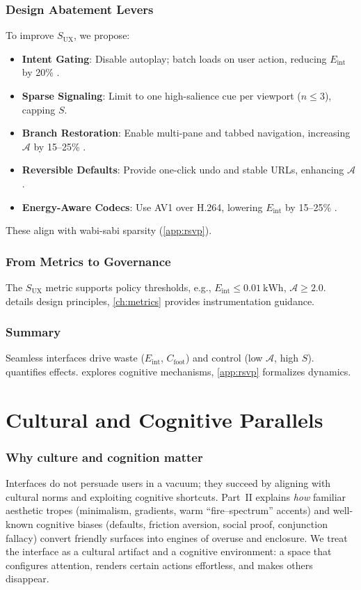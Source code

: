 \documentclass[openany]{book}
\newcommand{\Sent}{S} %
\newcommand{\Eint}{E_{\mathrm{int}}} %
\newcommand{\Cfoot}{C_{\mathrm{foot}}} %
\newcommand{\Auton}{\mathcal{A}} %
\newcommand{\SUX}{S_{\mathrm{UX}}} %
\newcommand{\kWh}{\mathrm{kWh}}
\begin{document}
\section{Design Abatement Levers}
\label{sec:abatement}
To improve \(\SUX\), we propose:
\begin{itemize}
  \item \textbf{Intent Gating}: Disable autoplay; batch loads on user action, reducing \(\Eint\) by 20\% \citep{extentia2024}.
  \item \textbf{Sparse Signaling}: Limit to one high-salience cue per viewport (\(n \leq 3\)), capping \(\Sent\).
  \item \textbf{Branch Restoration}: Enable multi-pane and tabbed navigation, increasing \(\Auton\) by 15--25\% \citep{doctorow2022}.
  \item \textbf{Reversible Defaults}: Provide one-click undo and stable URLs, enhancing \(\Auton\).
  \item \textbf{Energy-Aware Codecs}: Use AV1 over H.264, lowering \(\Eint\) by 15--25\% \citep{extentia2024}.
\end{itemize}
These align with wabi-sabi sparsity (\cref{app:rsvp}).

\section{From Metrics to Governance}
\label{sec:governance-preview}
The \(\SUX\) metric supports policy thresholds, e.g., \(\Eint \leq \SI{0.01}{\kWh}\), \(\Auton \geq 2.0\).  details design principles, \cref{ch:metrics} provides instrumentation guidance.

\section{Summary}
Seamless interfaces drive waste (\(\Eint\), \(\Cfoot\)) and control (low \(\Auton\), high \(\Sent\)).  quantifies effects.  explores cognitive mechanisms, \cref{app:rsvp} formalizes dynamics.

\part{Cultural and Cognitive Parallels}

\section*{Why culture and cognition matter}
Interfaces do not persuade users in a vacuum; they succeed by aligning with cultural norms and exploiting cognitive shortcuts. Part~II explains \emph{how} familiar aesthetic tropes (minimalism, gradients, warm “fire–spectrum” accents) and well-known cognitive biases (defaults, friction aversion, social proof, conjunction fallacy) convert friendly surfaces into engines of overuse and enclosure. We treat the interface as a cultural artifact and a cognitive environment: a space that configures attention, renders certain actions effortless, and makes others disappear.
\end{document}
